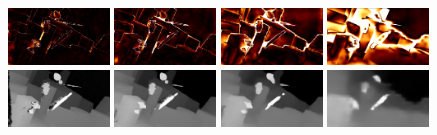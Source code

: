 \documentclass[runningheads]{llncs}
\begin{document}
\begin{figure}[!htbp]
\begin{center}
        \\
        \includegraphics[width=0.24\textwidth,clip]{figures/pred_comb_0_err.png}
        \includegraphics[width=0.24\textwidth,clip]{figures/pred_comb_1_err.png}
        \includegraphics[width=0.24\textwidth,clip]{figures/pred_comb_2_err.png}
        \includegraphics[width=0.24\textwidth,clip]{figures/pred_comb_3_err.png}\\
        \includegraphics[width=0.24\textwidth,clip]{figures/pred_0.png}
        \includegraphics[width=0.24\textwidth,clip]{figures/pred_1.png}
        \includegraphics[width=0.24\textwidth,clip]{figures/pred_2.png}
        \includegraphics[width=0.24\textwidth,clip]{figures/pred_3.png}
        \\

\end{center}
\end{figure}
\end{document}

